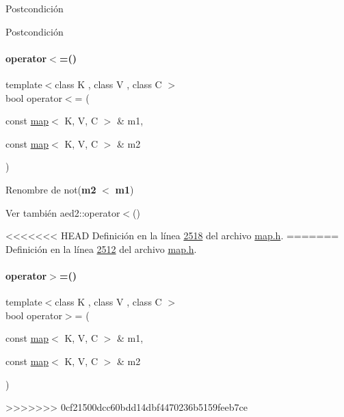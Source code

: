 \begin{DoxyPostcond}{\-Postcondición}
\begin{DoxyPostcond}{\-Postcondición}
\mbox{\label{classaed2_1_1map_afe374b37f17263d0cad3ee19a590d208_afe374b37f17263d0cad3ee19a590d208}} 
\paragraph{\texorpdfstring{operator$<$=()}{operator<=()}}
{\footnotesize\ttfamily template$<$class K , class V , class C $>$ \\
bool operator$<$= (\begin{DoxyParamCaption}\item[{const \hyperlink{classaed2_1_1map}{map}$<$ K, V, C $>$ \&}]{m1,  }\item[{const \hyperlink{classaed2_1_1map}{map}$<$ K, V, C $>$ \&}]{m2 }\end{DoxyParamCaption})\hspace{0.3cm}{\ttfamily [related]}}



Renombre de not({\bfseries m2} $<$ {\bfseries m1}) 

\begin{DoxySeeAlso}{Ver también}
aed2\+::operator$<$() 
\end{DoxySeeAlso}


<<<<<<< HEAD
\-Definición en la línea \hyperlink{map_8h_source_l02518}{2518} del archivo \hyperlink{map_8h_source}{map.\-h}.
=======
Definición en la línea \hyperlink{map_8h_source_l02512}{2512} del archivo \hyperlink{map_8h_source}{map.\+h}.

\mbox{\label{classaed2_1_1map_a093a6d1a055339c5fc6297a1d47a9159_a093a6d1a055339c5fc6297a1d47a9159}} 
\paragraph{\texorpdfstring{operator$>$=()}{operator>=()}}
{\footnotesize\ttfamily template$<$class K , class V , class C $>$ \\
bool operator$>$= (\begin{DoxyParamCaption}\item[{const \hyperlink{classaed2_1_1map}{map}$<$ K, V, C $>$ \&}]{m1,  }\item[{const \hyperlink{classaed2_1_1map}{map}$<$ K, V, C $>$ \&}]{m2 }\end{DoxyParamCaption})\hspace{0.3cm}{\ttfamily [related]}}
>>>>>>> 0cf21500dcc60bdd14dbf4470236b5159feeb7ce




\end{DoxyPostcond}
\end{DoxyPostcond}
